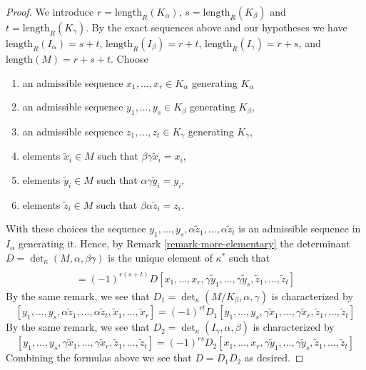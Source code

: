 \begin{proof}
\medskip\noindent
We introduce $r = \text{length}_R(K_\alpha)$,
$s = \text{length}_R(K_\beta)$ and $t = \text{length}_R(K_\gamma)$.
By the exact sequences above and our hypotheses we have
$\text{length}_R(I_\alpha) = s + t$, $\text{length}_R(I_\beta) = r + t$,
$\text{length}_R(I_\gamma) = r + s$, and
$\text{length}(M) = r + s + t$.
Choose
\begin{enumerate}
\item an admissible sequence $x_1, \ldots, x_r \in K_\alpha$
generating $K_\alpha$
\item an admissible sequence $y_1, \ldots, y_s \in K_\beta$
generating $K_\beta$,
\item an admissible sequence $z_1, \ldots, z_t \in K_\gamma$
generating $K_\gamma$,
\item elements $\tilde x_i \in M$ such that $\beta\gamma\tilde x_i = x_i$,
\item elements $\tilde y_i \in M$ such that $\alpha\gamma\tilde y_i = y_i$,
\item elements $\tilde z_i \in M$ such that $\beta\alpha\tilde z_i = z_i$.
\end{enumerate}
With these choices the sequence
$y_1, \ldots, y_s, \alpha\tilde z_1, \ldots, \alpha\tilde z_t$
is an admissible sequence in $I_\alpha$ generating it.
Hence, by Remark \ref{remark-more-elementary} the determinant
$D = \det_\kappa(M, \alpha, \beta\gamma)$ is the
unique element of $\kappa^*$ such that
\begin{align*}
[y_1, \ldots, y_s,
\alpha\tilde z_1, \ldots, \alpha\tilde z_s,
\tilde x_1, \ldots, \tilde x_r] \\
= (-1)^{r(s + t)} D
[x_1, \ldots, x_r,
\gamma\tilde y_1, \ldots, \gamma\tilde y_s,
\tilde z_1, \ldots, \tilde z_t]
\end{align*}
By the same remark, we see that
$D_1 = \det_\kappa(M/K_\beta, \alpha, \gamma)$
is characterized by
$$
[y_1, \ldots, y_s,
\alpha\tilde z_1, \ldots, \alpha\tilde z_t,
\tilde x_1, \ldots, \tilde x_r]
=
(-1)^{rt} D_1
[y_1, \ldots, y_s,
\gamma\tilde x_1, \ldots, \gamma\tilde x_r,
\tilde z_1, \ldots, \tilde z_t]
$$
By the same remark, we see that
$D_2 = \det_\kappa(I_\gamma, \alpha, \beta)$ is characterized by
$$
[y_1, \ldots, y_s,
\gamma\tilde x_1, \ldots, \gamma\tilde x_r,
\tilde z_1, \ldots, \tilde z_t]
=
(-1)^{rs} D_2
[x_1, \ldots, x_r,
\gamma\tilde y_1, \ldots, \gamma\tilde y_s,
\tilde z_1, \ldots, \tilde z_t]
$$
Combining the formulas above we see that $D = D_1 D_2$
as desired.
\end{proof}


